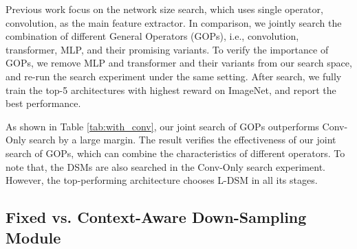 \documentclass{article} \usepackage{iclr2022_conference,times}
\begin{document}
Previous work \citep{mnas} focus on the network size search, which uses single operator, convolution, as the main feature extractor. In comparison, we jointly search the combination of different General Operators (GOPs), i.e., convolution, transformer, MLP, and their promising variants. To verify the importance of GOPs, we remove MLP and transformer and their variants from our search space, and re-run the search experiment under the same setting. After search, we fully train the top-5 architectures with highest reward on ImageNet, and report the best performance. 

As shown in Table \ref{tab:with_conv}, our joint search of GOPs outperforms Conv-Only search by a large margin. The result verifies the effectiveness of our joint search of GOPs, which can combine the characteristics of different operators. To note that, the DSMs are also searched in the Conv-Only search experiment. However, the top-performing architecture chooses L-DSM in all its stages.

\subsection{Fixed vs. Context-Aware Down-Sampling Module}
\end{document}
